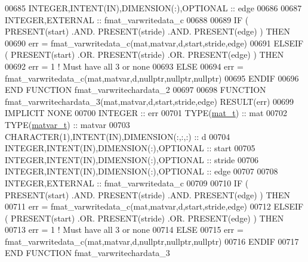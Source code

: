 \begin{DoxyCode}
00685     \textcolor{keywordtype}{INTEGER},\textcolor{keywordtype}{INTENT(IN)},\textcolor{keywordtype}{DIMENSION(:)},\textcolor{keywordtype}{OPTIONAL} :: edge
00686 
00687     \textcolor{keywordtype}{INTEGER},\textcolor{keywordtype}{EXTERNAL}                         :: fmat\_varwritedata\_c
00688 
00689     \textcolor{keywordflow}{IF} ( \textcolor{keyword}{PRESENT}(start) .AND. \textcolor{keyword}{PRESENT}(stride) .AND. \textcolor{keyword}{PRESENT}(edge) ) \textcolor{keywordflow}{THEN}
00690         err = fmat\_varwritedata\_c(mat,matvar,d,start,stride,edge)
00691     \textcolor{keywordflow}{ELSEIF} ( \textcolor{keyword}{PRESENT}(start) .OR. \textcolor{keyword}{PRESENT}(stride) .OR. \textcolor{keyword}{PRESENT}(edge) ) \textcolor{keywordflow}{THEN}
00692         err = 1    \textcolor{comment}{! Must have all 3 or none}
00693     \textcolor{keywordflow}{ELSE}
00694         err = fmat\_varwritedata\_c(mat,matvar,d,nullptr,nullptr,nullptr)
00695 \textcolor{keywordflow}{    ENDIF}
00696 \textcolor{keyword}{END FUNCTION }fmat\_varwritechardata\_2
00697 
00698 \textcolor{keyword}{FUNCTION }fmat\_varwritechardata\_3(mat,matvar,d,start,stride,edge) \textcolor{keyword}{RESULT}(err)
00699 \textcolor{keywordtype}{IMPLICIT NONE}
00700     \textcolor{keywordtype}{INTEGER}                                  :: err
00701     \textcolor{keywordtype}{TYPE}(\hyperlink{group___m_a_t_gab0fc888f5a5d79943b16284b1f91c2e8}{mat\_t})                              :: mat
00702     \textcolor{keywordtype}{TYPE}(\hyperlink{group___m_a_t_structmatvar__t}{matvar\_t})                           :: matvar
00703     \textcolor{keywordtype}{CHARACTER(1)},\textcolor{keywordtype}{INTENT(IN)},\textcolor{keywordtype}{DIMENSION(:,:,:)} :: d
00704     \textcolor{keywordtype}{INTEGER},\textcolor{keywordtype}{INTENT(IN)},\textcolor{keywordtype}{DIMENSION(:)},\textcolor{keywordtype}{OPTIONAL} :: start
00705     \textcolor{keywordtype}{INTEGER},\textcolor{keywordtype}{INTENT(IN)},\textcolor{keywordtype}{DIMENSION(:)},\textcolor{keywordtype}{OPTIONAL} :: stride
00706     \textcolor{keywordtype}{INTEGER},\textcolor{keywordtype}{INTENT(IN)},\textcolor{keywordtype}{DIMENSION(:)},\textcolor{keywordtype}{OPTIONAL} :: edge
00707 
00708     \textcolor{keywordtype}{INTEGER},\textcolor{keywordtype}{EXTERNAL}                         :: fmat\_varwritedata\_c
00709 
00710     \textcolor{keywordflow}{IF} ( \textcolor{keyword}{PRESENT}(start) .AND. \textcolor{keyword}{PRESENT}(stride) .AND. \textcolor{keyword}{PRESENT}(edge) ) \textcolor{keywordflow}{THEN}
00711         err = fmat\_varwritedata\_c(mat,matvar,d,start,stride,edge)
00712     \textcolor{keywordflow}{ELSEIF} ( \textcolor{keyword}{PRESENT}(start) .OR. \textcolor{keyword}{PRESENT}(stride) .OR. \textcolor{keyword}{PRESENT}(edge) ) \textcolor{keywordflow}{THEN}
00713         err = 1    \textcolor{comment}{! Must have all 3 or none}
00714     \textcolor{keywordflow}{ELSE}
00715         err = fmat\_varwritedata\_c(mat,matvar,d,nullptr,nullptr,nullptr)
00716 \textcolor{keywordflow}{    ENDIF}
00717 \textcolor{keyword}{END FUNCTION }fmat\_varwritechardata\_3
\end{DoxyCode}
